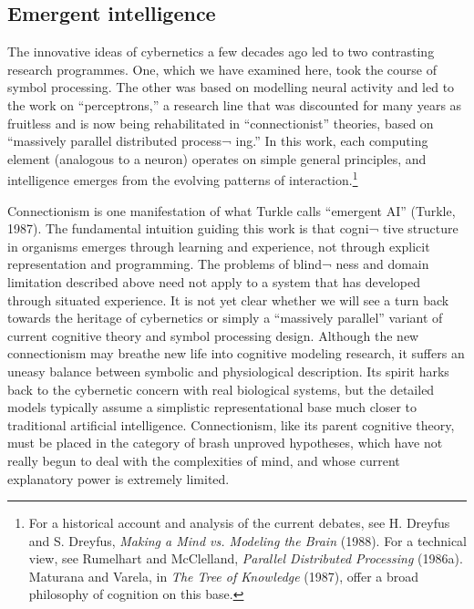 \documentclass[12pt]{article}
\begin{document}
\subsection{Emergent intelligence}

The innovative ideas of cybernetics a few decades ago led to two contrasting research programmes. One, which we have examined here, took the course of symbol processing. The other was based on modelling neural activity and led to the work on “perceptrons,” a research line that was discounted for many years as fruitless and is now being rehabilitated in “connectionist” theories, based on “massively parallel distributed process¬ ing.” In this work, each computing element (analogous to a neuron) operates on simple general principles, and intelligence emerges from the evolving patterns of interaction.\footnote{For a historical account and analysis of the current debates, see H. Dreyfus and S. Dreyfus, {\it Making a Mind vs. Modeling the Brain} (1988). For a technical view, see Rumelhart and McClelland, {\it Parallel Distributed Processing} (1986a). Maturana and Varela, in {\it The Tree of Knowledge} (1987), offer a broad philosophy of cognition on this base.}

Connectionism is one manifestation of what Turkle calls “emergent AI” (Turkle, 1987). The fundamental intuition guiding this work is that cogni¬ tive structure in organisms emerges through learning and experience, not through explicit representation and programming. The problems of blind¬ ness and domain limitation described above need not apply to a system that has developed through situated experience.
It is not yet clear whether we will see a turn back towards the heritage of cybernetics or simply a “massively parallel” variant of current cognitive theory and symbol processing design. Although the new connectionism may breathe new life into cognitive modeling research, it suffers an uneasy balance between symbolic and physiological description. Its spirit harks back to the cybernetic concern with real biological systems, but the detailed models typically assume a simplistic representational base much closer to traditional artificial intelligence. Connectionism, like its parent cognitive theory, must be placed in the category of brash unproved hypotheses, which have not really begun to deal with the complexities of mind, and whose current explanatory power is extremely limited.
\end{document}
